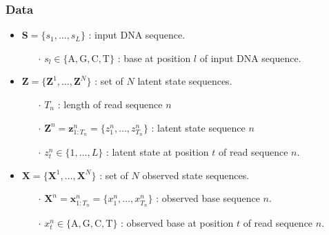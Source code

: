 \documentclass[10pt]{article}
\begin{document}
\subsubsection{Data}
\begin{itemize}
\item $\mathbf{S} = \{s_1,\ldots,s_L\}$ : input DNA sequence.
\begin{itemize}
  \item[$\cdot$] $s_l \in \{\mathrm{A,G,C,T}\}$ : base at position $l$ of input DNA sequence.
\end{itemize}
\item $\mathbf{Z} =\{\mathbf{Z}^1,\ldots,\mathbf{Z}^N\}$ : set of $N$ latent state sequences.
\begin{itemize}
\item[$\cdot$] $T_n$ : length of read sequence $n$
\item[$\cdot$] $\mathbf{Z}^n = \mathbf{z}^n_{1:T_n} = \{z^n_1,\ldots,z^n_{T_n}\}$ : latent state sequence $n$
\item[$\cdot$] $z_t^n \in \{1,\ldots,L\}$ : latent state at position $t$ of read sequence $n$.
\end{itemize}
\item $\mathbf{X} = \{\mathbf{X}^1,\ldots,\mathbf{X}^N\}$ : set of $N$ observed state sequences.
\begin{itemize}
\item[$\cdot$] $\mathbf{X}^n = \mathbf{x}_{1:T_n}^n = \{x_1^n,\ldots,x_{T_n}^n\}$ : observed base sequence $n$.
\item[$\cdot$] $x_t^n \in \{\mathrm{A,G,C,T}\}$ : observed base at position $t$ of read sequence $n$.
\end{itemize}
\end{itemize}
\end{document}

